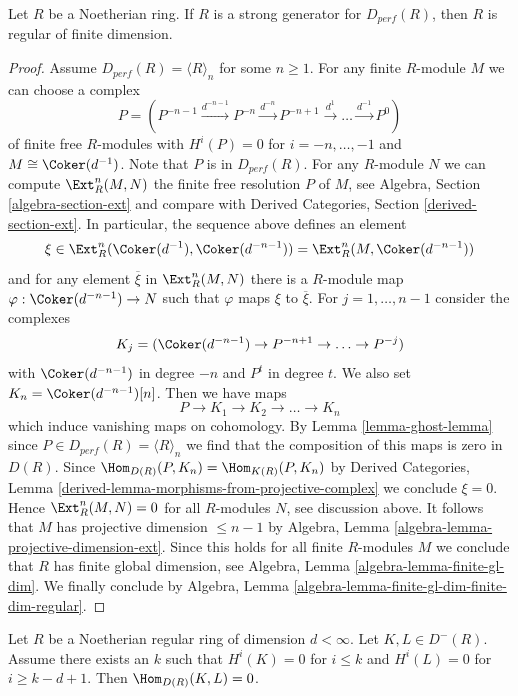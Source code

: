 \begin{lemma}
\label{lemma-not-regular-not-strong}
Let $R$ be a Noetherian ring. If $R$ is
a strong generator for $D_{perf}(R)$, then $R$ is regular
of finite dimension.
\end{lemma}

\begin{proof}
Assume $D_{perf}(R) = \langle R \rangle_n$ for some $n \geq 1$.
For any finite $R$-module $M$ we can choose a complex
$$
P = (
P^{-n - 1} \xrightarrow{d^{-n - 1}}
P^{-n} \xrightarrow{d^{-n}}
P^{-n + 1} \xrightarrow{d^1}
\ldots \xrightarrow{d^{-1}} P^0)
$$
of finite free $R$-modules with $H^i(P) = 0$ for $i = -n, \ldots, - 1$
and $M \cong \Coker(d^{-1})$. Note that $P$ is in $D_{perf}(R)$.
For any $R$-module $N$ we can compute $\Ext^n_R(M, N)$
the finite free resolution $P$ of $M$, see
Algebra, Section \ref{algebra-section-ext} and compare with
Derived Categories, Section \ref{derived-section-ext}.
In particular, the sequence above defines an element
$$
\xi \in \Ext^n_R(\Coker(d^{-1}), \Coker(d^{-n - 1})) =
\Ext^n_R(M, \Coker(d^{-n - 1}))
$$
and for any element $\overline{\xi}$ in $\Ext^n_R(M, N)$
there is a $R$-module map $\varphi : \Coker(d^{-n - 1}) \to N$ such
that $\varphi$ maps $\xi$ to $\overline{\xi}$.
For $j = 1, \ldots, n - 1$ consider the complexes
$$
K_j = (\Coker(d^{-n - 1}) \to P^{-n + 1} \to \ldots \to P^{-j})
$$
with $\Coker(d^{-n - 1})$ in degree $-n$ and $P^t$ in degree $t$.
We also set $K_n = \Coker(d^{-n - 1})[n]$. Then we have maps
$$
P \to K_1 \to K_2 \to \ldots \to K_n
$$
which induce vanishing maps on cohomology. By Lemma \ref{lemma-ghost-lemma}
since $P \in D_{perf}(R) = \langle R \rangle_n$ we find that the composition
of this maps is zero in $D(R)$. Since
$\Hom_{D(R)}(P, K_n) = \Hom_{K(R)}(P, K_n)$ by
Derived Categories, Lemma \ref{derived-lemma-morphisms-from-projective-complex}
we conclude $\xi = 0$. Hence $\Ext^n_R(M, N) = 0$ for all $R$-modules
$N$, see discussion above.
It follows that $M$ has projective dimension $\leq n - 1$ by
Algebra, Lemma \ref{algebra-lemma-projective-dimension-ext}.
Since this holds for all finite $R$-modules $M$ we conclude that
$R$ has finite global dimension, see
Algebra, Lemma \ref{algebra-lemma-finite-gl-dim}.
We finally conclude by Algebra, Lemma
\ref{algebra-lemma-finite-gl-dim-finite-dim-regular}.
\end{proof}

\begin{lemma}
\label{lemma-ext-regular}
Let $R$ be a Noetherian regular ring of dimension $d < \infty$.
Let $K, L \in D^-(R)$. Assume there exists an $k$ such that
$H^i(K) = 0$ for $i \leq k$ and $H^i(L) = 0$ for $i \geq k - d + 1$.
Then $\Hom_{D(R)}(K, L) = 0$.
\end{lemma}

